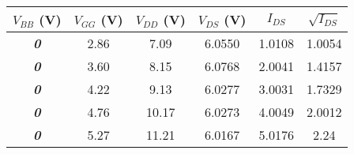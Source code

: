 \begin{tabular}{@{}cccccc@{}}
\toprule
\textbf{$V_{BB}$ (V)} & \multicolumn{1}{l}{\textbf{$V_{GG}$ (V)}} & \textbf{$V_{DD}$ (V)} & \textbf{$V_{DS}$ (V)} & \textbf{$I_{DS}$} & \textbf{$\sqrt{I_{DS}}$} \\ \midrule
\textit{\textbf{0}}     &  2.86     &   7.09    &  6.0550     & 1.0108    & 1.0054 \\
\textit{\textbf{0}}     &  3.60     &   8.15    &  6.0768       &  2.0041  & 1.4157    \\
\textit{\textbf{0}}     &  4.22     &   9.13    &  6.0277     & 3.0031      & 1.7329\\
\textit{\textbf{0}}     &  4.76     &   10.17    & 6.0273      & 4.0049     & 2.0012\\
\textit{\textbf{0}}     &  5.27     &   11.21    & 6.0167       &   5.0176   & 2.24\\ \bottomrule
\end{tabular}